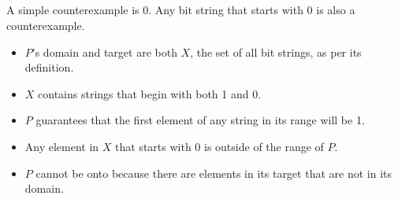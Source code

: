 \documentclass{article}
\begin{document}
\subsection{}
A simple counterexample is 0. Any bit string that starts with 0 is also a counterexample.
\begin{itemize}
    \item $P$'s domain and target are both $X$, the set of all bit strings, as per its definition. 
    \item $X$ contains strings that begin with both 1 and 0. 
    \item $P$ guarantees that the first element of any string in its range will be 1. 
    \item Any element in $X$ that starts with 0 is outside of the range of $P$.
    \item $P$ cannot be onto because there are elements in its target that are not in its domain.
\end{itemize}
\end{document}
